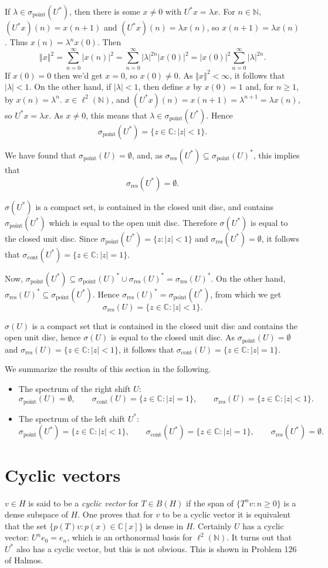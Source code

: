 \documentclass{article}
\newcommand{\point}{\sigma_{\textrm{point}}}
\newcommand{\cont}{\sigma_{\textrm{cont}}}
\newcommand{\residual}{\sigma_{\textrm{res}}}
\newcommand{\norm}[1]{\left\Vert #1 \right\Vert}
\begin{document}
If  $\lambda \in \point(U^*)$, then there is some $x \neq 0$ with $U^*x=\lambda x$. For $n \in \mathbb{N}$, $(U^*x)(n)=x(n+1)$ and
$(U^*x)(n)=\lambda x(n)$, so $x(n+1)=\lambda x(n)$. Thus $x(n)=\lambda^n x(0)$. Then
\[
\norm{x}^2= \sum_{n=0}^\infty |x(n)|^2 = \sum_{n=0}^\infty |\lambda|^{2n} |x(0)|^2=|x(0)|^2 \sum_{n=0}^\infty |\lambda|^{2n}.
\]
If $x(0) = 0$ then we'd get $x=0$, so $x(0) \neq 0$. As $\norm{x}^2 < \infty$, it follows that $|\lambda|<1$. On the other hand, if $|\lambda|<1$, then define $x$
by $x(0)=1$ and, for $n \geq 1$, by $x(n)=\lambda^n$. $x \in \ell^2(\mathbb{N})$, and $(U^* x)(n)=x(n+1)=\lambda^{n+1}=\lambda x(n)$, so $U^*x = \lambda x$. As $x \neq 0$, this 
means that $\lambda \in \point(U^*)$. Hence
\[
\point(U^*) = \{z \in \mathbb{C}: |z|<1\}.
\]

We have found that $\point(U) = \emptyset$, and, as $\residual(U^*) \subseteq \point(U)^*$, this implies that 
\[
\residual(U^*) = \emptyset.
\]

$\sigma(U^*)$ is a compact set, is contained in the closed unit disc, and contains $\point(U^*)$ which is equal to the open unit disc. Therefore
$\sigma(U^*)$ is equal to the closed unit disc. Since $\point(U^*)=\{z:|z|<1\}$ and $\residual(U^*)=\emptyset$, it follows that $\cont(U^*)=\{z \in 
\mathbb{C}: |z|=1\}$.

Now, $\point(U^*) \subseteq \point(U)^* \cup \residual(U)^*=\residual(U)^*$.
On the other hand, $\residual(U)^* \subseteq \point(U^*)$.
Hence $\residual(U)^*= \point(U^*)$, from which we get
\[
\residual(U)= \{z \in \mathbb{C}: |z|<1\}.
\]

$\sigma(U)$ is a compact set that is contained in the closed unit disc and contains the open unit disc,
hence $\sigma(U)$ is equal to the closed unit disc. As $\point(U)=\emptyset$ and $\residual(U)=\{z \in \mathbb{C}: |z|<1\}$,
it follows that $\cont(U)=\{z \in \mathbb{C}: |z|=1\}$.

We summarize the results of this section in the following.
\begin{itemize}
\item The spectrum of the right shift $U$:
\[
\point(U)=\emptyset, \qquad \cont(U)=\{z \in \mathbb{C}:|z|=1\}, \qquad \residual(U)=\{z \in \mathbb{C}:|z|<1\}.
\]
\item The spectrum of the left shift $U^*$:
\[
\point(U^*)=\{z \in \mathbb{C}:|z|<1\}, \qquad \cont(U^*)=\{z \in \mathbb{C}:|z|=1\}, \qquad
\residual(U^*)=\emptyset.
\]
\end{itemize}


\section{Cyclic vectors}
$v \in H$ is said to be a {\em cyclic vector} for $T \in B(H)$ if  the span of
$\{T^n v: n \geq 0\}$ is a dense subspace of $H$.
One proves that for $v$ to be a cyclic vector it is equivalent that the set $\{p(T)v: p(x) \in \mathbb{C}[x]\}$ is dense in $H$.
Certainly $U$ has a cyclic vector: $U^n e_0=e_n$, which is an orthonormal basis for $\ell^2(\mathbb{N})$. 
It turns out that $U^*$ also has a cyclic vector, but this is not obvious. This is shown in Problem 126 of Halmos.
\end{document}
